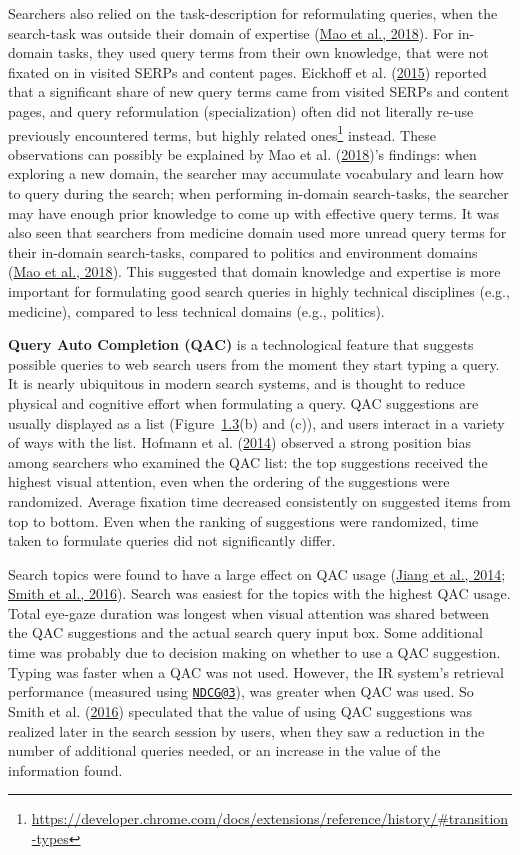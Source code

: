 \documentclass[a4paper, nobind]{templates/ociamthesis}
\begin{document}
Searchers also relied on the task-description for reformulating queries,
when the search-task was outside their domain of expertise (\protect\hyperlink{ref-133}{Mao et al., 2018}). For
in-domain tasks, they used query terms from their own knowledge, that
were not fixated on in visited SERPs and content pages. Eickhoff et al. (\protect\hyperlink{ref-127}{2015}) reported
that a significant share of new query terms came from visited SERPs and
content pages, and query reformulation (specialization) often did not
literally re-use previously encountered terms, but highly related
ones\footnote{\url{https://developer.chrome.com/docs/extensions/reference/history/\#transition-types}} instead. These observations can possibly be explained by Mao et al. (\protect\hyperlink{ref-133}{2018})'s
findings: when exploring a new domain, the searcher may accumulate
vocabulary and learn how to query during the search; when performing
in-domain search-tasks, the searcher may have enough prior knowledge to
come up with effective query terms. It was also seen that searchers from
medicine domain used more unread query terms for their in-domain
search-tasks, compared to politics and environment domains (\protect\hyperlink{ref-133}{Mao et al., 2018}). This
suggested that domain knowledge and expertise is more important for
formulating good search queries in highly technical disciplines (e.g.,
medicine), compared to less technical domains (e.g., politics).

\textbf{Query Auto Completion (QAC)} is a technological feature that suggests
possible queries to web search users from the moment they start typing a
query. It is nearly ubiquitous in modern search systems, and is thought
to reduce physical and cognitive effort when formulating a query. QAC
suggestions are usually displayed as a list
(Figure~\protect\hyperlink{fig_int_Q}{1.3}(b)
and (c)), and users interact in a variety of ways with the list. Hofmann et al. (\protect\hyperlink{ref-125}{2014})
observed a strong position bias among searchers who examined the QAC
list: the top suggestions received the highest visual attention, even
when the ordering of the suggestions were randomized. Average fixation
time decreased consistently on suggested items from top to bottom. Even
when the ranking of suggestions were randomized, time taken to formulate
queries did not significantly differ.

Search topics were found to have a large effect on QAC usage
(\protect\hyperlink{ref-126}{Jiang et al., 2014}; \protect\hyperlink{ref-129}{Smith et al., 2016}). Search was easiest for the topics with the highest QAC
usage. Total eye-gaze duration was longest when visual attention was
shared between the QAC suggestions and the actual search query input
box. Some additional time was probably due to decision making on whether
to use a QAC suggestion. Typing was faster when a QAC was not used.
However, the IR system's retrieval performance (measured using \href{mailto:NDCG@3}{\nolinkurl{NDCG@3}}),
was greater when QAC was used. So Smith et al. (\protect\hyperlink{ref-129}{2016}) speculated that the value of
using QAC suggestions was realized later in the search session by users,
when they saw a reduction in the number of additional queries needed, or
an increase in the value of the information found.
\end{document}
